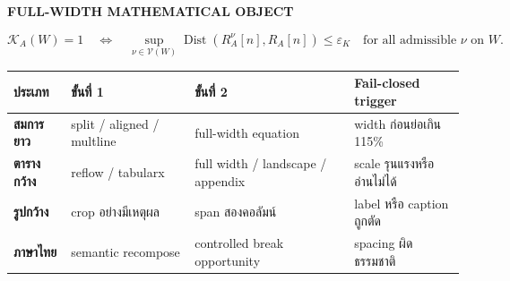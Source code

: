 \documentclass[10pt,a4paper]{article}
\begin{document}
\vspace{5pt}
\begin{center}
{\uisans\bfseries\fontsize{8.2}{9.8}\selectfont FULL-WIDTH MATHEMATICAL OBJECT}\par\vspace{3pt}
\begin{equation}
\mathcal{K}_A(W)=1
\quad\Longleftrightarrow\quad
\sup_{\nu\in\mathcal{V}(W)}
\operatorname{Dist}\!\left(R_A^{\nu}[n],R_A[n]\right)
\le \varepsilon_K
\quad\text{for all admissible }\nu\text{ on }W.
\label{eq:wide}
\end{equation}
\end{center}
\vspace{4pt}

\begin{center}
\label{tab:widepolicy}
\small
\begin{tabularx}{0.94\textwidth}{@{}>{\bfseries}lXXl@{}}
\toprule
ประเภท & ขั้นที่ 1 & ขั้นที่ 2 & Fail-closed trigger\\
\midrule
สมการยาว & split / aligned / multline & full-width equation & width ก่อนย่อเกิน 115\%\\
ตารางกว้าง & reflow / tabularx & full width / landscape / appendix & scale รุนแรงหรืออ่านไม่ได้\\
รูปกว้าง & crop อย่างมีเหตุผล & span สองคอลัมน์ & label หรือ caption ถูกตัด\\
ภาษาไทย & semantic recompose & controlled break opportunity & spacing ผิดธรรมชาติ\\
\bottomrule
\end{tabularx}
\end{center}
\end{document}

